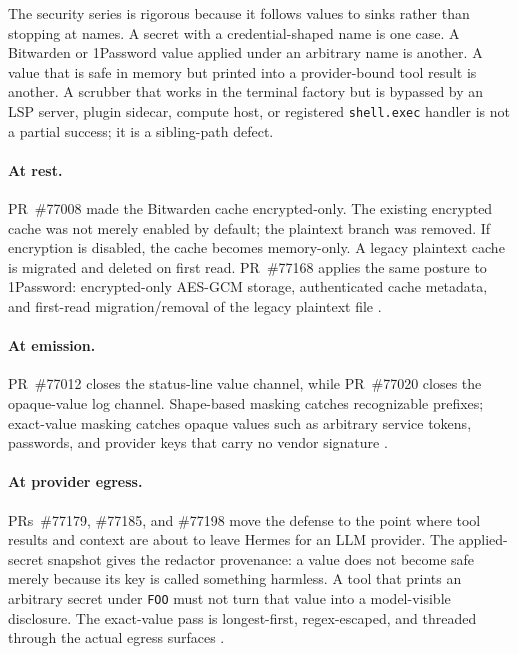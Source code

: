 \documentclass[11pt]{article}
\theoremstyle{definition}
\theoremstyle{plain}
\theoremstyle{remark}
\begin{document}
The security series is rigorous because it follows values to sinks rather than
stopping at names. A secret with a credential-shaped name is one case. A
Bitwarden or 1Password value applied under an arbitrary name is another. A
value that is safe in memory but printed into a provider-bound tool result is
another. A scrubber that works in the terminal factory but is bypassed by an
LSP server, plugin sidecar, compute host, or registered \texttt{shell.exec}
handler is not a partial success; it is a sibling-path defect.

\paragraph{At rest.}
PR~\#77008 made the Bitwarden cache encrypted-only. The existing encrypted
cache was not merely enabled by default; the plaintext branch was removed.
If encryption is disabled, the cache becomes memory-only. A legacy plaintext
cache is migrated and deleted on first read. PR~\#77168 applies the same
posture to 1Password: encrypted-only AES-GCM storage, authenticated cache
metadata, and first-read migration/removal of the legacy plaintext file
\citep{hermespr77008,hermespr77168}.

\paragraph{At emission.}
PR~\#77012 closes the status-line value channel, while PR~\#77020 closes the
opaque-value log channel. Shape-based masking catches recognizable prefixes;
exact-value masking catches opaque values such as arbitrary service tokens,
passwords, and provider keys that carry no vendor signature
\citep{hermespr77012,hermespr77020}.

\paragraph{At provider egress.}
PRs~\#77179, \#77185, and \#77198 move the defense to the point where tool
results and context are about to leave Hermes for an LLM provider. The
applied-secret snapshot gives the redactor provenance: a value does not
become safe merely because its key is called something harmless. A tool that
prints an arbitrary secret under \texttt{FOO} must not turn that value into a
model-visible disclosure. The exact-value pass is longest-first,
regex-escaped, and threaded through the actual egress surfaces
\citep{hermespr77179,hermespr77185,hermespr77198}.
\end{document}
